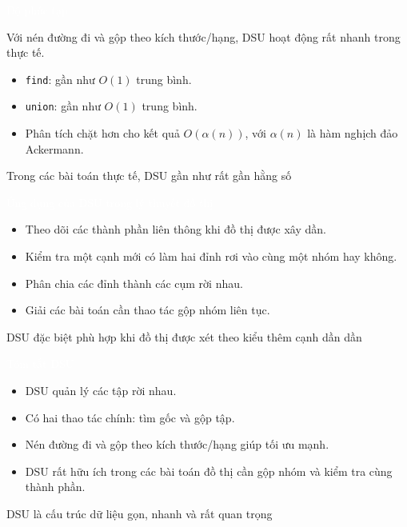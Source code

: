 \documentclass{beamer}
\newcommand{\hlblue}[1]{\textcolor{myblue}{#1}}
\newcommand{\hlgreen}[1]{\textcolor{mygreen}{#1}}
\newcommand{\hlred}[1]{\textcolor{myred}{#1}}
\newcommand{\hlpurple}[1]{\textcolor{mypurple}{#1}}
\newcommand{\hlorange}[1]{\textcolor{myorange}{#1}}
\newcommand{\hlwhite}[1]{\textcolor{white}{#1}}
\begin{document}
\begin{frame}{\hlwhite{Độ phức tạp}}
\begin{tcolorbox}[title=\textbf{\hlgreen{Khi tối ưu đầy đủ}}]
Với \hlblue{nén đường đi} và \hlblue{gộp theo kích thước/hạng}, DSU hoạt động rất nhanh trong thực tế.
\end{tcolorbox}

\begin{itemize}
  \item \texttt{find}: gần như \(O(1)\) trung bình.
  \item \texttt{union}: gần như \(O(1)\) trung bình.
  \item Phân tích chặt hơn cho kết quả \(O(\alpha(n))\), với \(\alpha(n)\) là hàm nghịch đảo Ackermann.
\end{itemize}

\pause

\begin{tcolorbox}
\centering
\hlpurple{Trong các bài toán thực tế, DSU gần như rất gần hằng số}
\end{tcolorbox}
\end{frame}


\begin{frame}{\hlwhite{Ứng dụng của DSU trong lý thuyết đồ thị}}
\begin{itemize}
  \item Theo dõi các thành phần liên thông khi đồ thị được xây dần.
  \item Kiểm tra một cạnh mới có làm hai đỉnh rơi vào cùng một nhóm hay không.
  \item Phân chia các đỉnh thành các cụm rời nhau.
  \item Giải các bài toán cần thao tác gộp nhóm liên tục.
\end{itemize}

\pause

\begin{tcolorbox}
\centering
\hlorange{DSU đặc biệt phù hợp khi đồ thị được xét theo kiểu thêm cạnh dần dần}
\end{tcolorbox}
\end{frame}


\begin{frame}{\hlwhite{Tóm tắt DSU}}
\begin{itemize}
  \item DSU quản lý các tập rời nhau.
  \item Có hai thao tác chính: \hlblue{tìm gốc} và \hlgreen{gộp tập}.
  \item \hlred{Nén đường đi} và \hlpurple{gộp theo kích thước/hạng} giúp tối ưu mạnh.
  \item DSU rất hữu ích trong các bài toán đồ thị cần gộp nhóm và kiểm tra cùng thành phần.
\end{itemize}

\pause

\begin{tcolorbox}
\centering
\hlred{DSU là cấu trúc dữ liệu gọn, nhanh và rất quan trọng}
\end{tcolorbox}
\end{frame}
\end{document}
